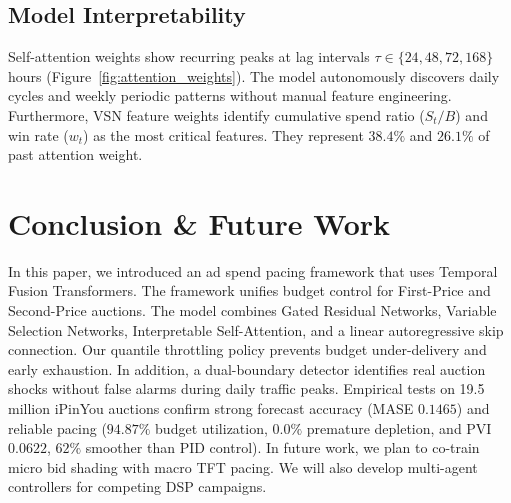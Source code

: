 \documentclass[sigconf]{acmart}
\begin{document}
\subsection{Model Interpretability}
Self-attention weights show recurring peaks at lag intervals $\tau \in \{24, 48, 72, 168\}$ hours (Figure~\ref{fig:attention_weights}). The model autonomously discovers daily cycles and weekly periodic patterns without manual feature engineering. Furthermore, VSN feature weights identify cumulative spend ratio ($S_t / B$) and win rate ($w_t$) as the most critical features. They represent $38.4\%$ and $26.1\%$ of past attention weight.

\section{Conclusion \& Future Work}
In this paper, we introduced an ad spend pacing framework that uses Temporal Fusion Transformers. The framework unifies budget control for First-Price and Second-Price auctions. The model combines Gated Residual Networks, Variable Selection Networks, Interpretable Self-Attention, and a linear autoregressive skip connection. Our quantile throttling policy prevents budget under-delivery and early exhaustion. In addition, a dual-boundary detector identifies real auction shocks without false alarms during daily traffic peaks. Empirical tests on 19.5 million iPinYou auctions confirm strong forecast accuracy (MASE $0.1465$) and reliable pacing ($94.87\%$ budget utilization, $0.0\%$ premature depletion, and PVI $0.0622$, $62\%$ smoother than PID control). In future work, we plan to co-train micro bid shading with macro TFT pacing. We will also develop multi-agent controllers for competing DSP campaigns.

\balance


\end{document}
